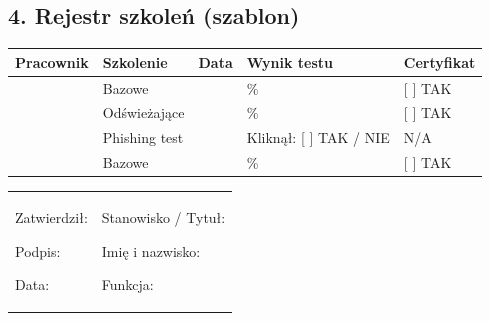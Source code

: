 \documentclass[12pt,a4paper]{article}
\begin{document}
\subsection{4. Rejestr szkoleń (szablon) }\label{rejestr-szkoleux144}

\begin{longtable}[]{@{}>{\raggedright\arraybackslash}p{}>{\raggedright\arraybackslash}p{}>{\raggedright\arraybackslash}p{}>{\raggedright\arraybackslash}p{}>{\raggedright\arraybackslash}p{}@{}}
\toprule\noalign{}
Pracownik & Szkolenie & Data & Wynik testu & Certyfikat \\
\midrule\noalign{}
\endhead
\bottomrule\noalign{}
\endlastfoot
\underline{\hspace{3cm}} & Bazowe & \underline{\hspace{2cm}} &
\underline{\hspace{2cm}}\% & {[} {]} TAK \\
\underline{\hspace{3cm}} & Odświeżające & \underline{\hspace{2cm}} &
\underline{\hspace{2cm}}\% & {[} {]} TAK \\
\underline{\hspace{3cm}} & Phishing test & \underline{\hspace{2cm}}
& Kliknął: {[} {]} TAK / NIE & N/A \\
\underline{\hspace{3cm}} & Bazowe & \underline{\hspace{2cm}} &
\underline{\hspace{2cm}}\% & {[} {]} TAK \\
\end{longtable}

\begin{longtable}[]{@{}
  >{\raggedright\arraybackslash}p{}
  >{\raggedright\arraybackslash}p{}@{}}
\toprule\noalign{}
\endhead
\bottomrule\noalign{}
\endlastfoot
\begin{minipage}[t]{\linewidth}\raggedright
Zatwierdził:

Podpis: \underline{\hspace{3cm}}

Data: \underline{\hspace{4cm}}
\end{minipage} & \begin{minipage}[t]{\linewidth}\raggedright
Stanowisko / Tytuł:

Imię i nazwisko: \underline{\hspace{3cm}}

Funkcja: \underline{\hspace{3cm}}
\end{minipage} \\
\end{longtable}
\end{document}
